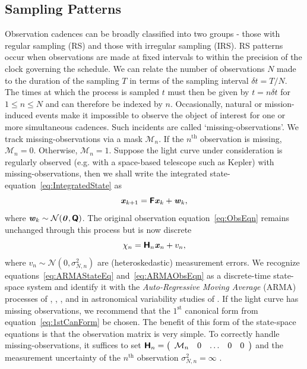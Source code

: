\documentclass[a4paper,fleqn,usenatbib]{mnras}
\begin{document}
\subsection[Sampling]{Sampling Patterns}\label{sec:Sampling}

Observation cadences can be broadly classified into two groups - those with regular sampling (RS) and those with irregular sampling (IRS). RS patterns occur when observations are made at fixed intervals to within the precision of the clock governing the schedule. We can relate the number of observations $N$ made to the duration of the sampling $T$ in terms of the sampling interval $\delta t = T/N$. The times at which the process is sampled $t$ must then be given by $t = n \delta t$ for $1 \leq n \leq N$ and can therefore be indexed by $n$. Occasionally, natural or mission-induced events make it impossible to observe the object of interest for one or more simultaneous cadences. Such incidents are called `missing-observations'. We track missing-observations via a mask $\mathcal{M}_{n}$. If the $n^{\mathrm{th}}$ observation is missing, $\mathcal{M}_{n} = 0$. Otherwise, $\mathcal{M}_{n} = 1$. Suppose the light curve under consideration is regularly observed (e.g. with a space-based telescope such as Kepler) with missing-observations, then we shall write the integrated state-equation~\eqref{eq:IntegratedState} as
\begin{equation}\label{eq:ARMAStateEq}
\textbf{\textit{x}}_{k+1} = \textbf{\textsf{F}}\textbf{\textit{x}}_{k} + \textbf{\textit{w}}_{k},
\end{equation}
where $\textbf{\textit{w}}_{k} \sim \mathcal{N}(\textbf{\textit{0}},\textbf{\textsf{Q}})$. The original observation equation~\eqref{eq:ObsEqn} remains unchanged through this process but is now discrete
\begin{equation}\label{eq:ARMAObsEqn}
\chi_{n} = \textbf{\textsf{H}}_{n}\textbf{\textit{x}}_{n} + v_{n},
\end{equation}
where $v_{n} \sim \mathcal{N}(0,\sigma_{N,n}^{2})$ are (heteroskedastic) measurement errors. We recognize equations~\eqref{eq:ARMAStateEq} and~\eqref{eq:ARMAObsEqn} as a discrete-time state-space system and identify it with the \textit{Auto-Regressive Moving Average} (ARMA) processes of \citet{BrockwellDavisTSTM}, \citet{BrockwellDavisITSF}, \citet{DurbinKoopman}, and in astronomical variability studies of \citet{Scargle81,GaskellPeterson87,KoratkarGaskell91}. If the light curve has missing observations, we recommend that the $1^{\mathrm{st}}$ canonical form from equation~\eqref{eq:1stCanForm} be chosen. The benefit of this form of the state-space equations is that the observation matrix is very simple. To correctly handle missing-observations, it suffices to set $\textbf{\textsf{H}}_{n} = \left( \begin{array}{ccccc} \mathcal{M}_{n} & 0 & \hdots & 0 & 0 \end{array} \right)$ and the measurement uncertainty of the $n^{\mathrm{th}}$ observation $\sigma_{N,n}^{2} = \infty$ \citep{Jones80,Jones}.
\end{document}
